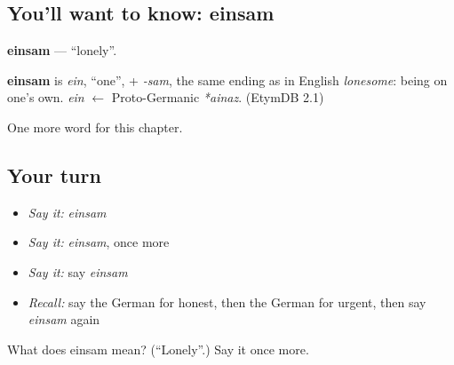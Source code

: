 \subsection*{You'll want to know: einsam}
\textbf{einsam} — \textquotedblleft{}lonely\textquotedblright{}.

\begin{cousinweb}
\textbf{einsam} is \emph{ein}, \textquotedblleft{}one\textquotedblright{}, + \emph{-sam}, the same ending as in English \emph{lonesome}: being on one's own. \emph{ein} $\leftarrow$ Proto-Germanic \emph{*ainaz}. (EtymDB 2.1)
\end{cousinweb}

\begin{grammarlens}[title={What you've built}]
One more word for this chapter.
\end{grammarlens}

\subsection*{Your turn}
\begin{itemize}
\raggedright
  \item \emph{Say it:} \emph{einsam}
  \item \emph{Say it:} \emph{einsam}, once more
  \item \emph{Say it:} say \emph{einsam}
  \item \emph{Recall:} say the German for honest, then the German for urgent, then say \emph{einsam} again
\end{itemize}

\begin{tcolorbox}[breakable,colback=teal!4,colframe=teal!35!black,title={Before you move on}]
What does einsam mean? (\textquotedblleft{}Lonely\textquotedblright{}.) Say it once more.
\end{tcolorbox}
